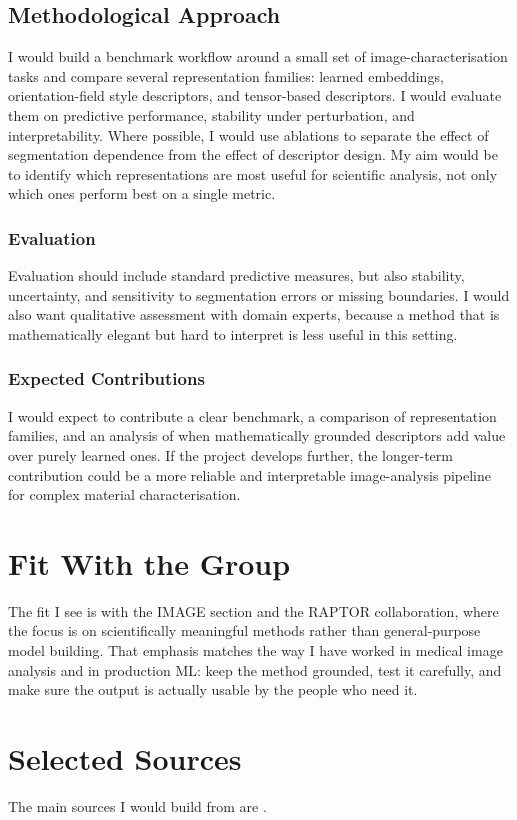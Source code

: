 \documentclass[11pt,a4paper]{article}
\begin{document}
\subsection{Methodological Approach}
I would build a benchmark workflow around a small set of image-characterisation tasks and compare several representation families: learned embeddings, orientation-field style descriptors, and tensor-based descriptors. I would evaluate them on predictive performance, stability under perturbation, and interpretability. Where possible, I would use ablations to separate the effect of segmentation dependence from the effect of descriptor design. My aim would be to identify which representations are most useful for scientific analysis, not only which ones perform best on a single metric.

\subsubsection{Evaluation}
Evaluation should include standard predictive measures, but also stability, uncertainty, and sensitivity to segmentation errors or missing boundaries. I would also want qualitative assessment with domain experts, because a method that is mathematically elegant but hard to interpret is less useful in this setting.

\subsubsection{Expected Contributions}
I would expect to contribute a clear benchmark, a comparison of representation families, and an analysis of when mathematically grounded descriptors add value over purely learned ones. If the project develops further, the longer-term contribution could be a more reliable and interpretable image-analysis pipeline for complex material characterisation.

\section{Fit With the Group}
The fit I see is with the IMAGE section and the RAPTOR collaboration, where the focus is on scientifically meaningful methods rather than general-purpose model building. That emphasis matches the way I have worked in medical image analysis and in production ML: keep the method grounded, test it carefully, and make sure the output is actually usable by the people who need it.

\section{Selected Sources}
The main sources I would build from are \cite{listing,thesis}.
\end{document}
